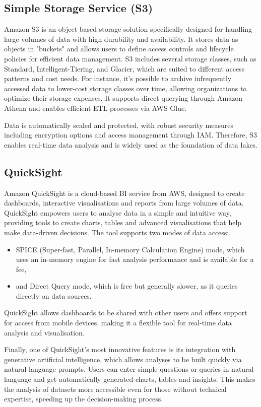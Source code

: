 \subsection{Simple Storage Service (S3)}
Amazon \ac{S3} is an object-based storage solution specifically designed for handling large volumes of data with high durability and availability. It stores data as objects in "buckets" and allows users to define access controls and lifecycle policies for efficient data management. \ac{S3} includes several storage classes, such as Standard, Intelligent-Tiering, and Glacier, which are suited to different access patterns and cost needs. For instance, it's possible to archive infrequently accessed data to lower-cost storage classes over time, allowing organizations to optimize their storage expenses. It supports direct querying through Amazon Athena and enables efficient \ac{ETL} processes via \ac{AWS} Glue.

Data is automatically scaled and protected, with robust security measures including encryption options and access management through \ac{IAM}. Therefore, \ac{S3} enables real-time data analysis and is widely used as the foundation of data lakes.

\subsection{QuickSight}
\label{sec:quick}
Amazon QuickSight is a cloud-based \ac{BI} service from \ac{AWS}, designed to create dashboards, interactive visualisations and reports from large volumes of data. QuickSight empowers users to analyse data in a simple and intuitive way, providing tools to create charts, tables and advanced visualisations that help make data-driven decisions.
The tool supports two modes of data access:
\begin{itemize}
    \item SPICE (Super-fast, Parallel, In-memory Calculation Engine) mode, which uses an in-memory engine for fast analysis performance and is available for a fee,
    \item and Direct Query mode, which is free but generally slower, as it queries directly on data sources.
\end{itemize}
QuickSight allows dashboards to be shared with other users and offers support for access from mobile devices, making it a flexible tool for real-time data analysis and visualisation.

Finally, one of QuickSight's most innovative features is its integration with generative artificial intelligence, which allows analyses to be built quickly via natural language prompts. Users can enter simple questions or queries in natural language and get automatically generated charts, tables and insights. This makes the analysis of datasets more accessible even for those without technical expertise, speeding up the decision-making process.
